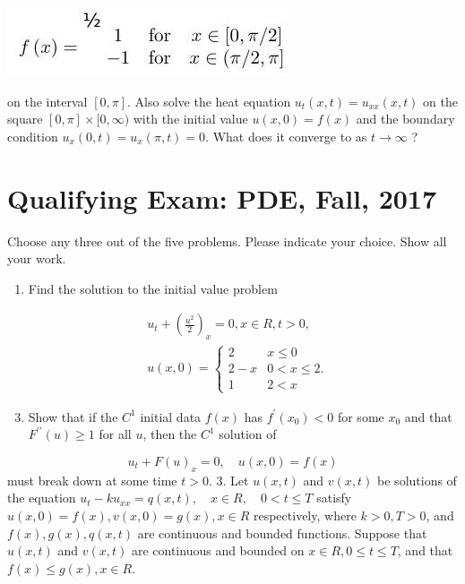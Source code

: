 \documentclass[10pt]{article}
\begin{document}
\includegraphics[max width=\textwidth]{2022_05_24_3cb84f0d9d0ada46d202g-01(1)}

on the interval $[0, \pi]$. Also solve the heat equation $u_{t}(x, t)=u_{x x}(x, t)$ on the square $[0, \pi] \times[0, \infty)$ with the initial value $u(x, 0)=f(x)$ and the boundary condition $u_{x}(0, t)=u_{x}(\pi, t)=0$. What does it converge to as $t \rightarrow \infty$ ?

\section{Qualifying Exam: PDE, Fall, 2017}
Choose any three out of the five problems. Please indicate your choice. Show all your work.

\begin{enumerate}
  \item Find the solution to the initial value problem
\end{enumerate}
$$
\begin{aligned}
&u_{t}+\left(\frac{u^{2}}{2}\right)_{x}=0, x \in R, t>0, \\
&u(x, 0)= \begin{cases}2 & x \leq 0 \\
2-x & 0<x \leq 2 . \\
1 & 2<x\end{cases}
\end{aligned}
$$

\begin{enumerate}
  \setcounter{enumi}{2}
  \item Show that if the $C^{1}$ initial data $f(x)$ has $f^{\prime}\left(x_{0}\right)<0$ for some $x_{0}$ and that $F^{\prime \prime}(u) \geq 1$ for all $u$, then the $C^{1}$ solution of
\end{enumerate}
$$
u_{t}+F(u)_{x}=0, \quad u(x, 0)=f(x)
$$
must break down at some time $t>0$. 3. Let $u(x, t)$ and $v(x, t)$ be solutions of the equation $u_{t}-k u_{x x}=q(x, t), \quad x \in R, \quad 0<t \leq T$ satisfy $u(x, 0)=f(x), v(x, 0)=g(x), x \in R$ respectively, where $k>0, T>0$, and $f(x), g(x), q(x, t)$ are continuous and bounded functions. Suppose that $u(x, t)$ and $v(x, t)$ are continuous and bounded on $x \in R, 0 \leq t \leq T$, and that $f(x) \leq g(x), x \in R .$
\end{document}
